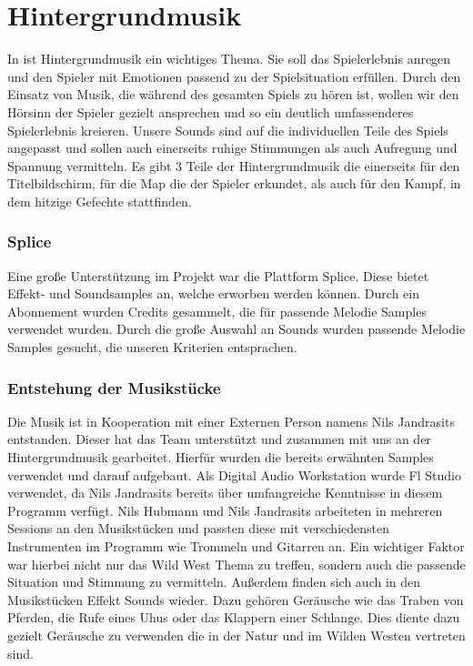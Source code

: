 
\section{Hintergrundmusik}\label{sec:hintergrundmusik}

\renewcommand{\kapitelautor}{Autor: Nils Hubmann} %

%
In \ff ist Hintergrundmusik ein wichtiges Thema. Sie soll das Spielerlebnis anregen und den Spieler mit Emotionen passend zu der Spielsituation erfüllen.
Durch den Einsatz von Musik, die während des gesamten Spiels zu hören ist, wollen wir den Hörsinn der Spieler gezielt ansprechen und so ein deutlich umfassenderes Spielerlebnis kreieren.
Unsere Sounds sind auf die individuellen Teile des Spiels angepasst und sollen auch einerseits ruhige Stimmungen als auch Aufregung und Spannung vermitteln.
Es gibt 3 Teile der Hintergrundmusik die einerseits für den Titelbildschirm, für die Map die der Spieler erkundet, als auch für den Kampf, in dem hitzige Gefechte stattfinden.

\subsubsection{Splice}\label{subsubsec:Splice}
Eine große Unterstützung im Projekt war die Plattform Splice. Diese bietet Effekt- und Soundsamples an, welche erworben werden können. Durch ein Abonnement wurden Credits gesammelt, die für passende Melodie Samples verwendet wurden.
Durch die große Auswahl an Sounds wurden passende Melodie Samples gesucht, die unseren Kriterien entsprachen.

\subsubsection{Entstehung der Musikstücke}\label{subsubsec:Musik-Enstehung}
Die Musik ist in Kooperation mit einer Externen Person namens Nils Jandrasits entstanden. Dieser hat das Team unterstützt und zusammen mit uns an der Hintergrundmusik gearbeitet.
Hierfür wurden die bereits erwähnten Samples verwendet und darauf aufgebaut. Als Digital Audio Workstation wurde Fl Studio verwendet, da Nils Jandrasits bereits über umfangreiche Kenntnisse in diesem Programm verfügt.
Nils Hubmann und Nils Jandrasits arbeiteten in mehreren Sessions an den Musikstücken und passten diese mit verschiedensten Instrumenten im Programm wie Trommeln und Gitarren an.
Ein wichtiger Faktor war hierbei nicht nur das Wild West Thema zu treffen, sondern auch die passende Situation und Stimmung zu vermitteln. Außerdem finden sich auch in den Musikstücken Effekt Sounds wieder.
Dazu gehören Geräusche wie das Traben von Pferden, die Rufe eines Uhus oder das Klappern einer Schlange.
Dies diente dazu gezielt Geräusche zu verwenden die in der Natur und im Wilden Westen vertreten sind.

